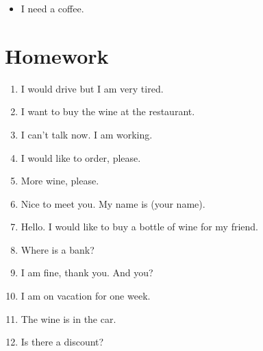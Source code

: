 \begin{itemize}
	\item I need a coffee. \\
\end{itemize}

\section{Homework} \label{0328-Homework}
\begin{enumerate}
	\item{I would drive but I am very tired.}        \\
	\item{I want to buy the wine at the restaurant.} \\
	\item{I can’t talk now. I am working.}           \\
	\item{I would like to order, please.}            \\
	\item{More wine, please.}                        \\
	\item{Nice to meet you. My name is (your name).} \\
	\item{Hello. I would like to buy a bottle of wine for my friend.} \\
	\item{Where is a bank?}                \\
	\item{I am fine, thank you. And you?}   \\
	\item{I am on vacation for one week.}  \\
	\item{The wine is in the car.}         \\
	\item{Is there a discount?}            \\

\end{enumerate}
